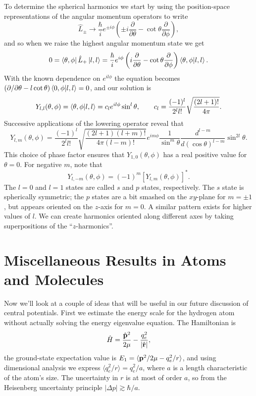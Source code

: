 \documentclass[../p116main.tex]{subfiles}
\begin{document}
To determine the spherical harmonics we start by using the position-space representations of the angular momentum operators to write
\[ \hat L_\pm \to \frac{\hbar}{i} e^{\pm i \phi} \left( \pm i \frac{\partial}{\partial \theta} - \cot \theta \frac{\partial}{\partial \phi} \right), \]
and so when we raise the highest angular momentum state we get
\[ 0 = \left< \theta, \phi \right| \hat L_+ \left| l,l \right> = \frac{\hbar}{i} e^{i\phi} \left( i \frac{\partial}{\partial \theta} - \cot \theta \frac{\partial}{\partial \phi} \right) \left< \theta, \phi \middle| l,l \right>. \]
With the known dependence on $e^{il\phi}$ the equation becomes $(\partial / \partial \theta - l \cot \theta) \left< 0, \phi \middle| l,l \right> = 0$, and our solution is
\[ Y_{l,l}(\theta, \phi) = \left< \theta, \phi \middle| l,l \right> = c_l e^{il\phi} \sin^{l} \theta, \qquad c_l = \frac{(-1)^{l}}{2^l l!} \sqrt{\frac{(2l+1)!}{4\pi}}. \]
Successive applications of the lowering operator reveal that
\[ Y_{l,m}(\theta, \phi) = \frac{(-1)^{l}}{2^l l!} \sqrt{\frac{(2l + 1)(l+m)!}{4\pi (l-m)!}} e^{im\phi} \frac{1}{\sin^m \theta} \frac{d^{l-m}}{d(\cos \theta)^{l-m}} \sin^{2l} \theta. \]
This choice of phase factor ensures that $Y_{1,0}(\theta, \phi)$ has a real positive value for $\theta = 0$.
For negative $m$, note that
\[ Y_{l, -m}(\theta, \phi) = (-1)^{m} [Y_{l,m}(\theta, \phi)]^*. \]
The $l=0$ and $l=1$ states are called $s$ and $p$ states, respectively.
The $s$ state is spherically symmetric; the $p$ states are a bit smashed on the $xy$-plane for $m = \pm 1$, but appears oriented on the $z$-axis for $m=0$.
A similar pattern exists for higher values of $l$.
We can create harmonics oriented along different axes by taking superpositions of the ``$z$-harmonics''.

\section{Miscellaneous Results in Atoms and Molecules}
Now we'll look at a couple of ideas that will be useful in our future discussion of central potentials.
First we estimate the energy scale for the hydrogen atom without actually solving the energy eigenvalue equation.
The Hamiltonian is
\[ \hat H = \frac{\hat{\mathbf{p}}^2}{2\mu} - \frac{q_e^2}{|\hat{\mathbf{r}}|}, \]
the ground-state expectation value is $E_1 = \langle \mathbf{p}^2 / 2\mu - q_e^2 / r \rangle$, and using dimensional analysis we express $\langle q_e^2 / r \rangle = q_e^2 / a$, where $a$ is a length characteristic of the atom's size.
The uncertainty in $r$ is at most of order $a$, so from the Heisenberg uncertainty principle $|\Delta p| \gtrsim \hbar / a$.
\end{document}
